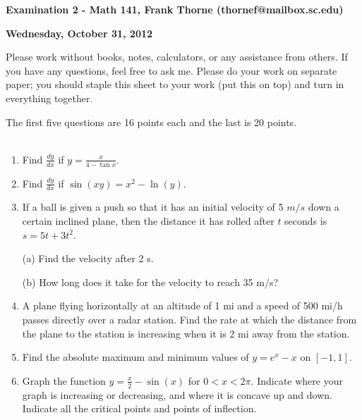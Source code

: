 \documentclass[12pt]{article}
\begin{document}
\setlength{\topmargin}{-2mm}





\begin{center}{\bf Examination 2 - Math 141, Frank Thorne (thornef@mailbox.sc.edu)}
\end{center}
\begin{center}
{\bf Wednesday, October 31, 2012}
\end{center}

Please work without books, notes, calculators, or any assistance from others. If you have
any questions, feel free to ask me. Please do your work on separate paper; you should staple this sheet to your work (put this on top)
and turn in everything together. 

The first five questions are 16 points each and the last is 20 points.
\\
\\
\begin{enumerate}[(1)]
\item
Find $\frac{dy}{dx}$ if $y = \frac{x}{4 - \tan x}$.

\item
Find $\frac{dy}{dx}$ if $\sin(xy) = x^2 - \ln(y)$.

\item
If a ball is given a push so that it has an initial velocity of 5 $m/s$ down a certain
inclined plane, then the distance it has rolled after $t$ seconds is $s = 5t + 3t^2$.

(a) Find the velocity after 2 s.

(b) How long does it take for the velocity to reach 35 m/s?

\item
A plane flying horizontally at an altitude of 1 mi and a speed of 500 mi/h passes directly over a radar
station. Find the rate at which the distance from the plane to the station is increasing when it is 2 mi away from
the station.

\item
Find the absolute maximum and minimum values of $y = e^x - x$ on $[-1, 1]$.
\item
Graph the function $y = \frac{x}{2} - \sin(x)$ for $0 < x < 2 \pi$. Indicate where your graph is increasing or decreasing,
and where it is concave up and down. Indicate all the critical points and points of inflection.

\end{enumerate}
\end{document}

